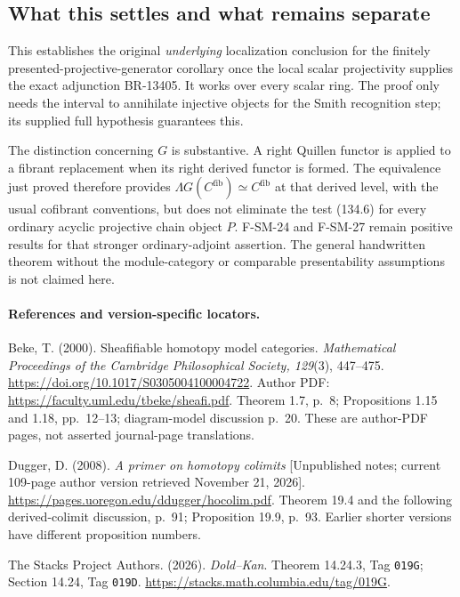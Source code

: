 \subsection{What this settles and what remains separate}
This establishes the original \emph{underlying} localization
conclusion for the finitely presented-projective-generator
corollary once the local scalar projectivity supplies the
exact adjunction BR-13405.  It works over every scalar ring.
The proof only needs the interval to annihilate injective
objects for the Smith recognition step; its supplied full
hypothesis guarantees this.

The distinction concerning \(G\) is substantive.
A right Quillen functor is applied to a fibrant replacement
when its right derived functor is formed.
The equivalence just proved therefore provides
\(\Lambda G(C^{\mathrm{fib}})\simeq C^{\mathrm{fib}}\)
at that derived level, with the usual cofibrant conventions,
but does not eliminate the test (134.6) for every ordinary
acyclic projective chain object \(P\).
F-SM-24 and F-SM-27 remain positive results for that stronger
ordinary-adjoint assertion.
The general handwritten theorem without the module-category
or comparable presentability assumptions is not claimed here.

\paragraph{References and version-specific locators.}
Beke, T. (2000). Sheafifiable homotopy model categories.
\emph{Mathematical Proceedings of the Cambridge Philosophical
Society, 129}(3), 447--475.
\url{https://doi.org/10.1017/S0305004100004722}.
Author PDF:
\url{https://faculty.uml.edu/tbeke/sheafi.pdf}.
Theorem 1.7, p.~8; Propositions 1.15 and 1.18, pp.~12--13;
diagram-model discussion p.~20.  These are author-PDF pages,
not asserted journal-page translations.

Dugger, D. (2008). \emph{A primer on homotopy colimits}
[Unpublished notes; current 109-page author version retrieved
November 21, 2026].
\url{https://pages.uoregon.edu/ddugger/hocolim.pdf}.
Theorem 19.4 and the following derived-colimit discussion,
p.~91; Proposition 19.9, p.~93.
Earlier shorter versions have different proposition numbers.

The Stacks Project Authors. (2026). \emph{Dold--Kan}.
Theorem 14.24.3, Tag \texttt{019G}; Section 14.24, Tag
\texttt{019D}.
\url{https://stacks.math.columbia.edu/tag/019G}.

